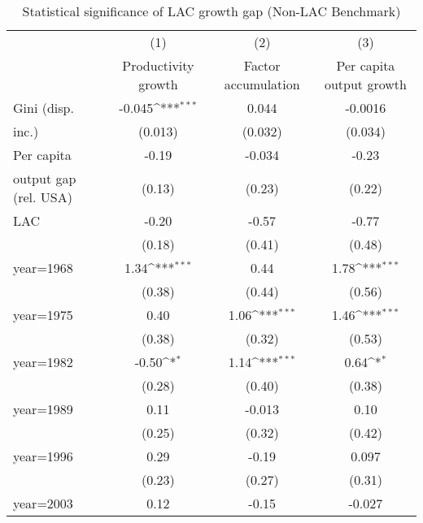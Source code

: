 \begin{sidewaystable}[htbp]\centering
\def\sym#1{\ifmmode^{#1}\else\(^{#1}\)\fi}
\caption{Statistical significance of LAC growth gap (Non-LAC Benchmark)}
\begin{tabular}{l*{3}{c}}
\toprule
                &\multicolumn{1}{c}{(1)}&\multicolumn{1}{c}{(2)}&\multicolumn{1}{c}{(3)}\\
                &\multicolumn{1}{c}{Productivity growth}&\multicolumn{1}{c}{Factor accumulation}&\multicolumn{1}{c}{Per capita output growth}\\
\midrule
Gini (disp.     &   -0.045\sym{***}&    0.044         &  -0.0016         \\
inc.)           &  (0.013)         &  (0.032)         &  (0.034)         \\
\addlinespace
Per capita      &    -0.19         &   -0.034         &    -0.23         \\
output gap (rel. USA)&   (0.13)         &   (0.23)         &   (0.22)         \\
\addlinespace
LAC             &    -0.20         &    -0.57         &    -0.77         \\
                &   (0.18)         &   (0.41)         &   (0.48)         \\
\addlinespace
year=1968       &     1.34\sym{***}&     0.44         &     1.78\sym{***}\\
                &   (0.38)         &   (0.44)         &   (0.56)         \\
\addlinespace
year=1975       &     0.40         &     1.06\sym{***}&     1.46\sym{***}\\
                &   (0.38)         &   (0.32)         &   (0.53)         \\
\addlinespace
year=1982       &    -0.50\sym{*}  &     1.14\sym{***}&     0.64\sym{*}  \\
                &   (0.28)         &   (0.40)         &   (0.38)         \\
\addlinespace
year=1989       &     0.11         &   -0.013         &     0.10         \\
                &   (0.25)         &   (0.32)         &   (0.42)         \\
\addlinespace
year=1996       &     0.29         &    -0.19         &    0.097         \\
                &   (0.23)         &   (0.27)         &   (0.31)         \\
\addlinespace
year=2003       &     0.12         &    -0.15         &   -0.027         \\

\end{tabular}
\end{sidewaystable}

